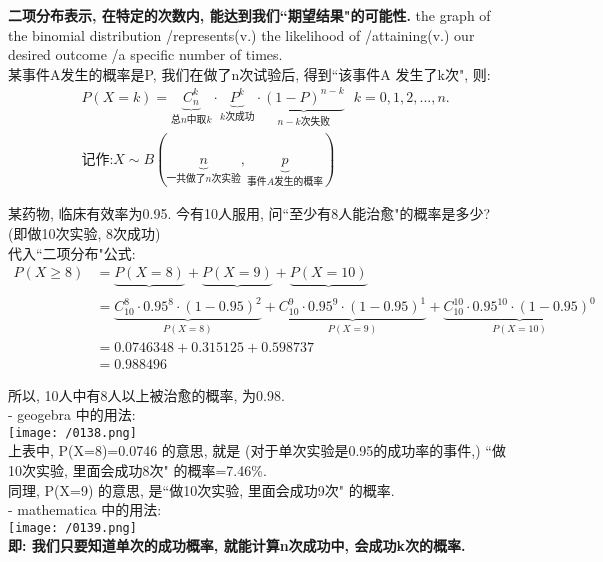 \documentclass[UTF8]{ctexart}
\begin{document}
	\textbf{二项分布表示, 在特定的次数内, 能达到我们``期望结果"的可能性.} the graph of the binomial distribution /represents(v.) the likelihood of /attaining(v.) our desired outcome /a specific number of times. \\


某事件A发生的概率是P, 我们在做了n次试验后, 得到``该事件A 发生了k次", 则: 
\begin{align*}  %
	&P\left( X=k \right) =\underset{\text{总}n\text{中取}k}{\underbrace{C_{n}^{k}}}\cdot \underset{k\text{次成功}}{\underbrace{P^k}}\cdot \underset{n-k\text{次失败}}{\underbrace{\left( 1-P \right) ^{n-k}}}\ \ \ k=0,1,2,...,n.\\
&\text{记作:}X \sim B\left( \underset{\text{一共做了}n\text{次实验}}{\underbrace{n}},\underset{\text{事件}A\text{发生的概率}}{\underbrace{p}} \right)
\end{align*}



\begin{myEnvSample}
某药物, 临床有效率为0.95. 今有10人服用, 问``至少有8人能治愈"的概率是多少? (即做10次实验, 8次成功) \\
代入``二项分布"公式:
\begin{align*}  %
	P\left( X\ge 8 \right) 
&=\underset{}{\underbrace{P\left( X=8 \right) }}+\underset{}{\underbrace{P\left( X=9 \right) }}+\underset{}{\underbrace{P\left( X=10 \right) }}\\
&=\underset{P\left( X=8 \right)}{\underbrace{C_{10}^{8}\cdot 0.95^8\cdot \left( 1-0.95 \right) ^2}}+\underset{P\left( X=9 \right)}{\underbrace{C_{10}^{9}\cdot 0.95^9\cdot \left( 1-0.95 \right) ^1}}+\underset{P\left( X=10 \right)}{\underbrace{C_{10}^{10}\cdot 0.95^{10}\cdot \left( 1-0.95 \right) ^0}}\\
&=0.0746348+0.315125+0.598737 \\
&=0.988496
\end{align*}

所以, 10人中有8人以上被治愈的概率, 为0.98. \\

- geogebra 中的用法: \\
\texttt{[image: /0138.png]} \\

上表中, P(X=8)=0.0746 的意思, 就是 (对于单次实验是0.95的成功率的事件,) ``做10次实验, 里面会成功8次" 的概率=7.46\%. \\
同理, P(X=9) 的意思, 是``做10次实验, 里面会成功9次" 的概率. \\

- mathematica 中的用法: \\
\texttt{[image: /0139.png]} \\

\textbf{即: 我们只要知道单次的成功概率, 就能计算n次成功中, 会成功k次的概率. }
\end{myEnvSample}
\vspace{1em} 
\end{document}
